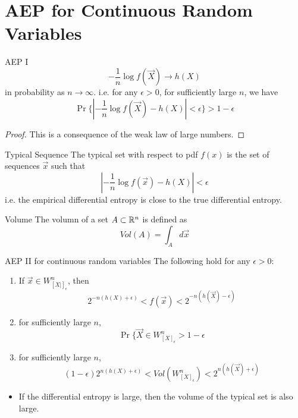 \documentclass[../main.tex]{subfiles}
\begin{document}
\section{AEP for Continuous Random Variables}
\begin{bbox}{AEP I}
    \[
    -\frac{1}{n}\log f(\vec X) \to h(X)
    \] in probability as $n\to \infty.$ i.e. for any $\epsilon > 0$, for sufficiently large $n$, we have \[
    \Pr\{|-\frac{1}{n}\log f(\vec X)-h(X)| < \epsilon\}>1-\epsilon
    \]
    \begin{proof}
        This is a consequence of the weak law of large numbers.
    \end{proof}
\end{bbox}
\begin{gbox}{Typical Sequence}
    The typical set with respect to pdf $f(x)$ is the set of sequences $\vec x$ such that \[
    |-\frac{1}{n}\log f(\vec x) - h(X)| < \epsilon
    \] i.e. the empirical differential entropy is close to the true differential entropy.
\end{gbox}
\begin{gbox}{Volume}
    The volumn of a set $A\subset \mathbb{R}^n$ is defined as \[
    Vol(A) = \int_A d\vec x
    \]
\end{gbox}
\begin{bbox}{AEP II for continuous random variables}
    The following hold for any $\epsilon > 0$: \begin{enumerate}
        \item If $\vec x\in W^n_{[X|]_\epsilon}$, then \[
        2^{-n(h(X)+\epsilon)} < f(\vec x) < 2^{-n(h(\vec X)-\epsilon )}
        \]
        \item for sufficiently large $n$, \[
        \Pr\{\vec X \in W^n_{[X]_\epsilon} > 1-\epsilon
        \]
        \item for sufficiently large $n$, \[
         (1-\epsilon)2^{n(h(X)+\epsilon)} < Vol(W^n_{[X]_\epsilon}) < 2^{n(h(\vec X)+\epsilon )}
        \]
    \end{enumerate}
    \begin{itemize}
        \item If the differential entropy is large, then the volume of the typical set is also large.
    \end{itemize}
\end{bbox}
\end{document}
